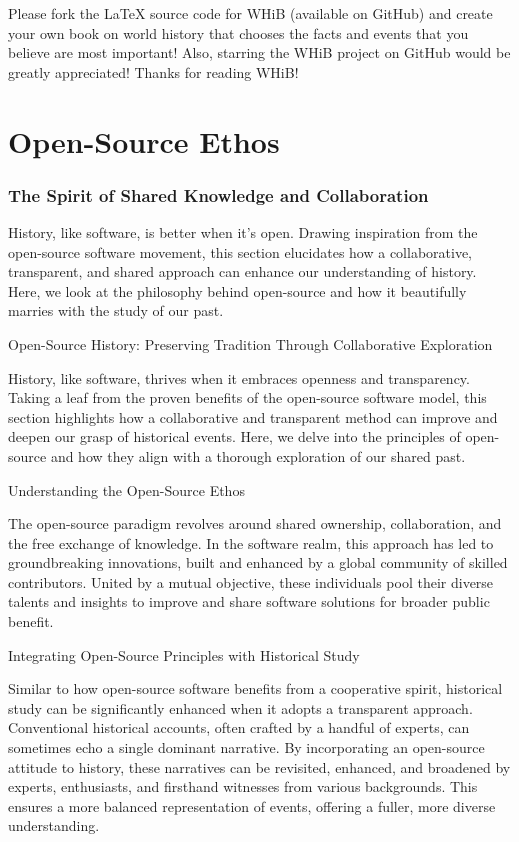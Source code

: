 \documentclass[a4paper,12pt]{book}
\begin{document}
Please fork the LaTeX source code for WHiB (available on GitHub) and create your own book on world history that chooses the facts and events that you believe are most important! Also, starring the WHiB project on GitHub would be greatly appreciated! Thanks for reading WHiB!

\chapter{Open-Source Ethos}
\subsection*{The Spirit of Shared Knowledge and Collaboration}
History, like software, is better when it's open. Drawing inspiration from the open-source software movement, this section elucidates how a collaborative, transparent, and shared approach can enhance our understanding of history. Here, we look at the philosophy behind open-source and how it beautifully marries with the study of our past.

Open-Source History: Preserving Tradition Through Collaborative Exploration

History, like software, thrives when it embraces openness and transparency. Taking a leaf from the proven benefits of the open-source software model, this section highlights how a collaborative and transparent method can improve and deepen our grasp of historical events. Here, we delve into the principles of open-source and how they align with a thorough exploration of our shared past.

Understanding the Open-Source Ethos

The open-source paradigm revolves around shared ownership, collaboration, and the free exchange of knowledge. In the software realm, this approach has led to groundbreaking innovations, built and enhanced by a global community of skilled contributors. United by a mutual objective, these individuals pool their diverse talents and insights to improve and share software solutions for broader public benefit.

Integrating Open-Source Principles with Historical Study

Similar to how open-source software benefits from a cooperative spirit, historical study can be significantly enhanced when it adopts a transparent approach. Conventional historical accounts, often crafted by a handful of experts, can sometimes echo a single dominant narrative. By incorporating an open-source attitude to history, these narratives can be revisited, enhanced, and broadened by experts, enthusiasts, and firsthand witnesses from various backgrounds. This ensures a more balanced representation of events, offering a fuller, more diverse understanding.
\end{document}
